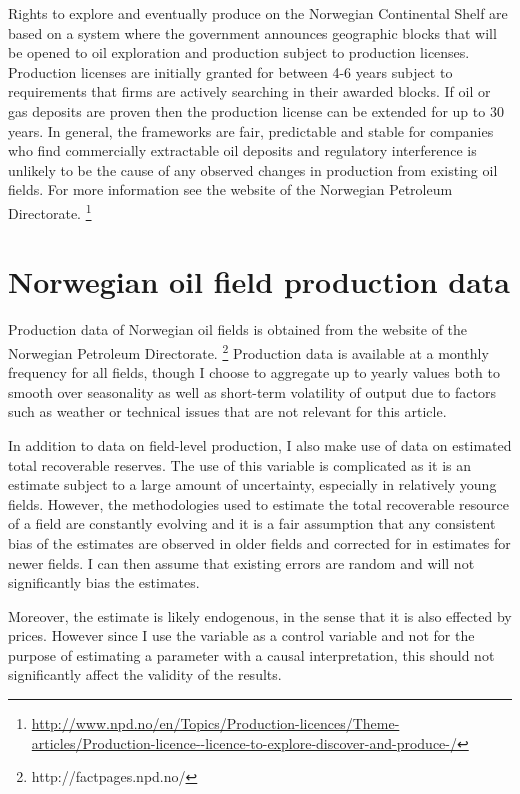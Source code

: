 \documentclass[12pt]{article}
\begin{document}
Rights to explore and eventually produce on the Norwegian Continental Shelf are based on a system where the government announces geographic blocks that will be opened to oil exploration and production subject to production licenses.  Production licenses are initially granted for between 4-6 years subject to requirements that firms are actively searching in their awarded blocks.  If oil or gas deposits are proven then the production license can be extended for up to 30 years.  In general, the frameworks are fair, predictable and stable for companies who find commercially extractable oil deposits and regulatory interference is unlikely to be the cause of any observed changes in production from existing oil fields.  For more information see the website of the Norwegian Petroleum Directorate. \footnote{\url{http://www.npd.no/en/Topics/Production-licences/Theme-articles/Production-licence--licence-to-explore-discover-and-produce-/}}

\section{Norwegian oil field production data}
Production data of Norwegian oil fields is obtained from the website of the Norwegian Petroleum Directorate. \footnote{http://factpages.npd.no/}  Production data is available at a monthly frequency for all fields, though I choose to aggregate up to yearly values both to smooth over seasonality as well as short-term volatility of output due to factors such as weather or technical issues that are not relevant for this article.  

In addition to data on field-level production, I also make use of data on estimated total recoverable reserves. The use of this variable is complicated as it is an estimate subject to a large amount of uncertainty, especially in relatively young fields.  However, the methodologies used to estimate the total recoverable resource of a field are constantly evolving and it is a fair assumption that any consistent bias of the estimates are observed in older fields and corrected for in estimates for newer fields.  I can then assume that existing errors are random and will not significantly bias the estimates.  

Moreover, the estimate is likely endogenous, in the sense that it is also effected by prices.  However since I use the variable as a control variable and not for the purpose of estimating a parameter with a causal interpretation, this should not significantly affect the validity of the results.  
\end{document}
